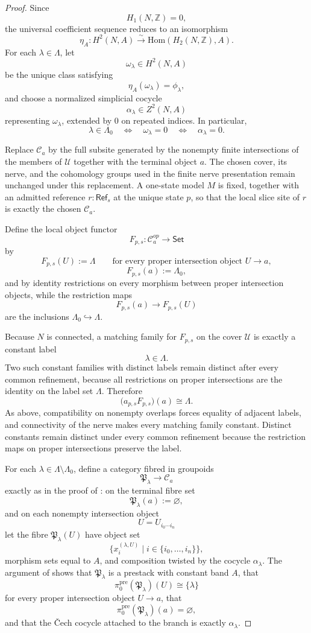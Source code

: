 \begin{proof}
Since
\[
H_1(N,\mathbb Z)=0,
\]
the universal coefficient sequence reduces to an isomorphism
\[
\eta_A:H^2(N,A)\xrightarrow{\sim}\mathrm{Hom}(H_2(N,\mathbb Z),A).
\]
For each $\lambda\in\Lambda$, let
\[
\omega_\lambda\in H^2(N,A)
\]
be the unique class satisfying
\[
\eta_A(\omega_\lambda)=\phi_\lambda,
\]
and choose a normalized simplicial cocycle
\[
\alpha_\lambda\in Z^2(N,A)
\]
representing $\omega_\lambda$, extended by $0$ on repeated indices. In particular,
\[
\lambda\in\Lambda_0
\quad\Longleftrightarrow\quad
\omega_\lambda=0
\quad\Longleftrightarrow\quad
\alpha_\lambda=0.
\]

Replace $\mathcal C_a$ by the full subsite generated by the nonempty finite intersections of the members of $\mathcal U$ together with the terminal object $a$. The chosen cover, its nerve, and the cohomology groups used in the finite nerve presentation remain unchanged under this replacement. A one-state model $M$ is fixed, together with an admitted reference $r:\mathsf{Ref}_s$ at the unique state $p$, so that the local slice site of $r$ is exactly the chosen $\mathcal C_a$.

Define the local object functor
\[
F_{p,s}:\mathcal C_a^{op}\to\mathsf{Set}
\]
by
\[
F_{p,s}(U):=\Lambda
\qquad
\text{for every proper intersection object }U\to a,
\]
\[
F_{p,s}(a):=\Lambda_0,
\]
and by identity restrictions on every morphism between proper intersection objects, while the restriction maps
\[
F_{p,s}(a)\to F_{p,s}(U)
\]
are the inclusions $\Lambda_0\hookrightarrow \Lambda$.

Because $N$ is connected, a matching family for $F_{p,s}$ on the cover $\mathcal U$ is exactly a constant label
\[
\lambda\in\Lambda.
\]
Two such constant families with distinct labels remain distinct after every common refinement, because all restrictions on proper intersections are the identity on the label set $\Lambda$. Therefore
\[
\bigl(a_{p,s}F_{p,s}\bigr)(a)\cong \Lambda.
\]
As above, compatibility on nonempty overlaps forces equality of adjacent labels, and connectivity of the nerve makes every matching family constant. Distinct constants remain distinct under every common refinement because the restriction maps on proper intersections preserve the label.

For each $\lambda\in\Lambda\setminus\Lambda_0$, define a category fibred in groupoids
\[
\mathfrak P_\lambda\to \mathcal C_a
\]
exactly as in the proof of : on the terminal fibre set
\[
\mathfrak P_\lambda(a):=\varnothing,
\]
and on each nonempty intersection object
\[
U=U_{i_0\cdots i_n}
\]
let the fibre $\mathfrak P_\lambda(U)$ have object set
\[
\{x_i^{(\lambda,U)}\mid i\in\{i_0,\dots,i_n\}\},
\]
morphism sets equal to $A$, and composition twisted by the cocycle $\alpha_\lambda$. The argument of  shows that $\mathfrak P_\lambda$ is a prestack with constant band $A$, that
\[
\pi_0^{\mathrm{pre}}(\mathfrak P_\lambda)(U)\cong\{ \lambda\}
\]
for every proper intersection object $U\to a$, that
\[
\pi_0^{\mathrm{pre}}(\mathfrak P_\lambda)(a)=\varnothing,
\]
and that the \v{C}ech cocycle attached to the branch is exactly $\alpha_\lambda$.


\end{proof}
